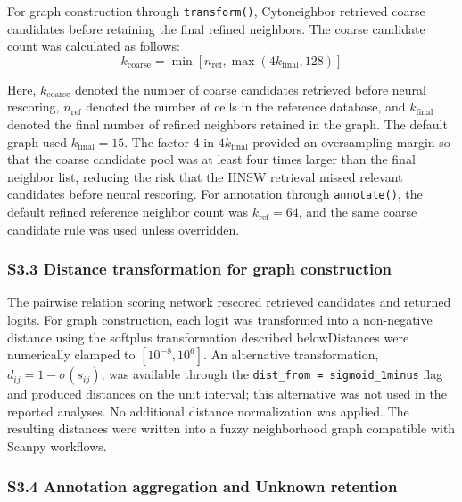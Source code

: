 \documentclass[11pt]{article}
\begin{document}
For graph construction through \texttt{transform()}, Cytoneighbor retrieved coarse candidates before retaining the final refined neighbors. The coarse candidate count was calculated as follows:
\begin{equation}
k_{\mathrm{coarse}} =
\min\left[n_{\mathrm{ref}}, \max\left(4k_{\mathrm{final}}, 128\right)\right]
\label{eq:coarse_count}
\end{equation}

Here, \(k_{\mathrm{coarse}}\) denoted the number of coarse candidates retrieved before neural rescoring, \(n_{\mathrm{ref}}\) denoted the number of cells in the reference database, and \(k_{\mathrm{final}}\) denoted the final number of refined neighbors retained in the graph. The default graph used \(k_{\mathrm{final}}=15\). The factor 4 in \(4k_{\mathrm{final}}\) provided an oversampling margin so that the coarse candidate pool was at least four times larger than the final neighbor list, reducing the risk that the HNSW retrieval missed relevant candidates before neural rescoring. For annotation through \texttt{annotate()}, the default refined reference neighbor count was \(k_{\mathrm{ref}}=64\), and the same coarse candidate rule was used unless overridden.

\subsubsection*{S3.3 Distance transformation for graph construction}

The pairwise relation scoring network rescored retrieved candidates and returned logits. For graph construction, each logit was transformed into a non-negative distance using the softplus transformation described below\. Distances were numerically clamped to \([10^{-8}, 10^{6}]\). An alternative transformation, \(d_{ij}=1-\sigma(s_{ij})\), was available through the \texttt{dist\_from = sigmoid\_1minus} flag and produced distances on the unit interval; this alternative was not used in the reported analyses. No additional distance normalization was applied. The resulting distances were written into a fuzzy neighborhood graph compatible with Scanpy workflows.
\subsubsection*{S3.4 Annotation aggregation and Unknown retention}
\end{document}
